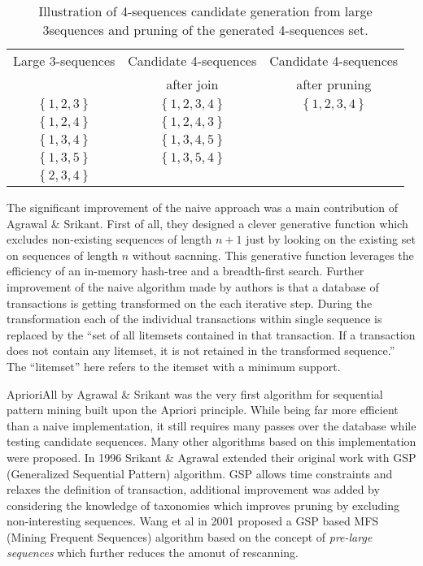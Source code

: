 \begin{table}
\begin{center}
    \begin{tabular}{ | c | c | c |}
    \hline
    Large 3-sequences & Candidate 4-sequences                     & Candidate 4-sequences \\ 
                      & after join                                & after pruning \\ 
    \hline
    $\left\{ 1, 2, 3 \right\} $ & $ \left\{ 1, 2, 3, 4 \right\} $ & $ \left\{ 1, 2, 3, 4 \right\} $ \\ 
    \hline
    $\left\{ 1, 2, 4 \right\} $ & $ \left\{ 1, 2, 4, 3 \right\} $ & \\ 
    \hline
    $\left\{ 1, 3, 4 \right\} $ & $ \left\{ 1, 3, 4, 5 \right\} $ & \\ 
    \hline
    $\left\{ 1, 3, 5 \right\} $ & $ \left\{ 1, 3, 5, 4 \right\} $ & \\ 
    \hline
    $\left\{ 2, 3, 4 \right\} $  &                                & \\ 
    \hline
    \end{tabular}
    \caption{Illustration of 4-sequences candidate generation from large 3sequences and pruning of the generated 4-sequences set.}
    \label{fig:apriori}
    \end{center}
\end{table}

The significant improvement of the naive approach was a main contribution of Agrawal \& Srikant. First of all, they designed a clever generative function which excludes non-existing sequences of length $n+1$ just by looking on the existing set on sequences of length $n$ without sacnning. This generative function leverages the efficiency of an in-memory hash-tree and a breadth-first search. Further improvement of the naive algorithm made by authors is that a database of transactions is getting transformed on the each iterative step. During the transformation each of the individual transactions within single sequence is replaced by the ``set of all litemsets contained
in that transaction. If a transaction does not contain any litemset, it is not retained in the transformed sequence.'' The ``litemset'' here refers to the itemset with a minimum support.

AprioriAll by Agrawal \& Srikant was the very first algorithm for sequential pattern mining built upon the Apriori principle. While being far more efficient than a naive implementation, it still requires many passes over the database while testing candidate sequences. Many other algorithms based on this implementation were proposed. In 1996 Srikant \& Agrawal extended their original work with GSP (Generalized Sequential Pattern) algorithm. GSP allows time constraints and relaxes the definition of transaction, additional improvement was added by considering the knowledge of taxonomies which improves pruning by excluding non-interesting sequences. Wang et al in 2001 proposed a GSP based MFS (Mining Frequent Sequences) \cite{citeulike:5164952} algorithm based on the concept of \textit{pre-large sequences} which further reduces the amonut of rescanning.
